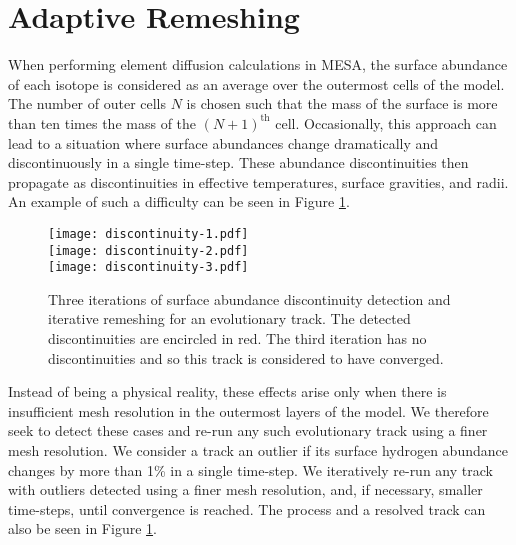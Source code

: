 \documentclass[manuscript,linenumbers]{aastex6}
\newcommand{\colwidth}{0.5\textwidth}
\begin{document}
\section{Adaptive Remeshing}
\label{sec:remeshing}

When performing element diffusion calculations in MESA, the surface abundance of each isotope is considered as an average over the outermost cells of the model. The number of outer cells $N$ is chosen such that the mass of the surface is more than ten times the mass of the $(N+1)^{\text{th}}$ cell. Occasionally, this approach can lead to a situation where surface abundances change dramatically and discontinuously in a single time-step. These abundance discontinuities then propagate as discontinuities in effective temperatures, surface gravities, and radii. An example of such a difficulty can be seen in Figure \ref{fig:discontinuity}. 

\begin{figure}
    \centering
    \texttt{[image: discontinuity-1.pdf]}\\
    \texttt{[image: discontinuity-2.pdf]}\\
    \texttt{[image: discontinuity-3.pdf]}\\
    \caption{Three iterations of surface abundance discontinuity detection and iterative remeshing for an evolutionary track. The detected discontinuities are encircled in red. The third iteration has no discontinuities and so this track is considered to have converged. \vspace*{5mm} \label{fig:discontinuity} }
\end{figure}

Instead of being a physical reality, these effects arise only when there is insufficient mesh resolution in the outermost layers of the model. We therefore seek to detect these cases and re-run any such evolutionary track using a finer mesh resolution. We consider a track an outlier if its surface hydrogen abundance changes by more than 1\% in a single time-step. We iteratively re-run any track with outliers detected using a finer mesh resolution, and, if necessary, smaller time-steps, until convergence is reached. The process and a resolved track can also be seen in Figure \ref{fig:discontinuity}. 
\end{document}
